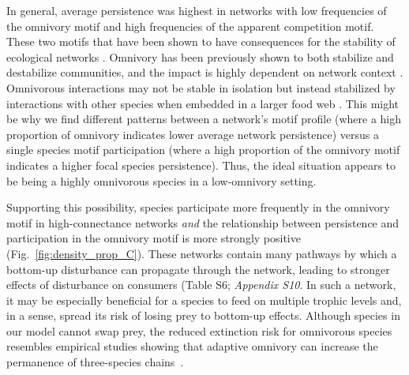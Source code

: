 \documentclass[12pt]{article}
\begin{document}
\begin{spacing}{2.0}
    
    In general, average persistence was highest in networks with low frequencies of the omnivory motif and high frequencies of the apparent competition motif. 
    These two motifs that have been shown to have consequences for the stability of ecological networks \citep{Borrelli2015a,XX}.
    Omnivory has been previously shown to both stabilize and destabilize communities, and the impact is highly dependent on network context \citep{bascompte2005simple, Monteiro2016}. 
    Omnivorous interactions may not be stable in isolation but instead stabilized by interactions with other species when embedded in a larger food web \citep{Kratina2012}. 
    This might be why we find different patterns between a network's motif profile (where a high proportion of omnivory indicates lower average network persistence) versus a single species motif participation (where a high proportion of the omnivory motif indicates a higher focal species persistence).
    Thus, the ideal situation appears to be being a highly omnivorous species in a low-omnivory setting. 
    
    Supporting this possibility, species participate more frequently in the omnivory motif in high-connectance networks \emph{and} the relationship between persistence and participation in the omnivory motif is more strongly positive (Fig.~\ref{fig:density_prop_C}).
    These networks contain many pathways by which a bottom-up disturbance can propagate through the network, leading to stronger effects of disturbance on consumers (Table S6; \emph{Appendix S10}.
    In such a network, it may be especially beneficial for a species to feed on multiple trophic levels and, in a sense, spread its risk of losing prey to bottom-up effects.
    Although species in our model cannot swap prey, the reduced extinction risk for omnivorous species resembles empirical studies showing that adaptive omnivory can increase the permanence of three-species chains~\citep{Fagan1997, Kvrivan2005, AbramsFung2010}.
    

\end{spacing}
\end{document}
